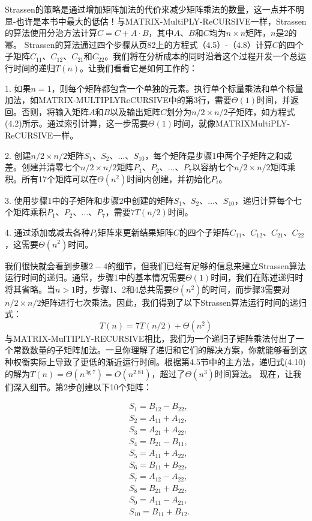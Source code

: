 \documentclass[lang=cn,newtx,10pt,scheme=chinese]{elegantbook}
\begin{document}
Strassen的策略是通过增加矩阵加法的代价来减少矩阵乘法的数量，这一点并不明显-也许是本书中最大的低估！与MATRIX-MultiPLY-ReCURSIVE一样，Strassen的算法使用分治方法计算$C=C+A \cdot B$，其中$A、B$和$C$均为$n \times n$矩阵，$n$是2的幂。 Strassen的算法通过四个步骤从页82上的方程式（4.5）-（4.8）计算$C$的四个子矩阵$C_{11}、C_{12}、C_{21}$和$C_{22}$。我们将在分析成本的同时沿着这个过程开发一个总运行时间的递归$T(n)$。让我们看看它是如何工作的：

1. 如果$n=1$，则每个矩阵都包含一个单独的元素。执行单个标量乘法和单个标量加法，如MATRIX-MULTIPLYReCURSIVE中的第3行，需要$\Theta(1)$时间，并返回。否则，将输入矩阵$A$和$B$以及输出矩阵$C$划分为$n/2\times n/2$子矩阵，如方程式(4.2)所示。通过索引计算，这一步需要$\Theta(1)$时间，就像MATRIXMultiPLY-ReCURSIVE一样。

2. 创建$n/2\times n/2$矩阵$S_1、S_2、\ldots、S_{10}$，每个矩阵是步骤1中两个子矩阵之和或差。创建并清零七个$n/2\times n/2$矩阵$P_1、P_2、\ldots、P_7$以容纳七个$n/2\times n/2$矩阵乘积。所有17个矩阵可以在$\Theta\left(n^2\right)$时间内创建，并初始化$P_i$。

3. 使用步骤1中的子矩阵和步骤2中创建的矩阵$S_1、S_2、\ldots、S_{10}$，递归计算每个七个矩阵乘积$P_1、P_2、\ldots、P_7$，需要$7T(n/2)$时间。

4. 通过添加或减去各种$P_i$矩阵来更新结果矩阵$C$的四个子矩阵$C_{11}、C_{12}、C_{21}、C_{22}$，这需要$\Theta\left(n^2\right)$时间。

我们很快就会看到步骤$2-4$的细节，但我们已经有足够的信息来建立Strassen算法运行时间的递归。通常，步骤1中的基本情况需要$\Theta(1)$时间，我们在陈述递归时将其省略。当$n>1$时，步骤1、2和4总共需要$\Theta\left(n^2\right)$的时间，而步骤3需要对$n/2\times n/2$矩阵进行七次乘法。因此，我们得到了以下Strassen算法运行时间的递归式：
$$
T(n)=7 T(n / 2)+\Theta\left(n^2\right)
$$
与MATRIX-MulTIPLY-RECURSIVE相比，我们为一个递归子矩阵乘法付出了一个常数数量的子矩阵加法。一旦你理解了递归和它们的解决方案，你就能够看到这种权衡实际上导致了更低的渐近运行时间。根据第4.5节中的主方法，递归式(4.10)的解为$T(n)=\Theta\left(n^{\lg 7}\right)=O\left(n^{2.81}\right)$，超过了$\Theta\left(n^3\right)$时间算法。
现在，让我们深入细节。第2步创建以下10个矩阵：



$$
\begin{aligned}
& S_1=B_{12}-B_{22}, \\
& S_2=A_{11}+A_{12}, \\
& S_3=A_{21}+A_{22}, \\
& S_4=B_{21}-B_{11}, \\
& S_5=A_{11}+A_{22}, \\
& S_6=B_{11}+B_{22}, \\
& S_7=A_{12}-A_{22}, \\
& S_8=B_{21}+B_{22}, \\
& S_9=A_{11}-A_{21}, \\
& S_{10}=B_{11}+B_{12} .
\end{aligned}
$$
\end{document}
